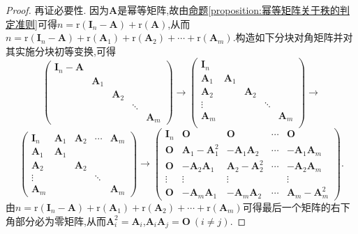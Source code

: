 \documentclass[../../main.tex]{subfiles}%
\begin{document}
\begin{proof}
再证必要性. 因为\(\boldsymbol{A}\)是幂等矩阵,故由\hyperref[proposition:幂等矩阵关于秩的判定准则]{命题\ref{proposition:幂等矩阵关于秩的判定准则}}可得\(n=\text{r}(\boldsymbol{I}_n - \boldsymbol{A})+\text{r}(\boldsymbol{A})\),从而\(n=\text{r}(\boldsymbol{I}_n - \boldsymbol{A})+\text{r}(\boldsymbol{A}_1)+\text{r}(\boldsymbol{A}_2)+\cdots+\text{r}(\boldsymbol{A}_m)\).构造如下分块对角矩阵并对其实施分块初等变换,可得
\[
\begin{pmatrix}
\boldsymbol{I}_n - \boldsymbol{A}&&&&\\
&\boldsymbol{A}_1&&&\\
&&\boldsymbol{A}_2&&\\
&&&\ddots&\\
&&&&\boldsymbol{A}_m
\end{pmatrix}\to
\left( \begin{matrix}
\boldsymbol{I}_n&		&		&		&		\\
\boldsymbol{A}_1&		\boldsymbol{A}_1&		&		&		\\
\boldsymbol{A}_2&		&		\boldsymbol{A}_2&		&		\\
\vdots&		&		&		\ddots&		\\
\boldsymbol{A}_m&		&		&		&		\boldsymbol{A}_m\\
\end{matrix} \right) \to
\]
\[
\begin{pmatrix}
\boldsymbol{I}_n&\boldsymbol{A}_1&\boldsymbol{A}_2&\cdots&\boldsymbol{A}_m\\
\boldsymbol{A}_1&\boldsymbol{A}_1&&&\\
\boldsymbol{A}_2&&\boldsymbol{A}_2&&\\
\vdots&&&\ddots&\\
\boldsymbol{A}_m&&&&\boldsymbol{A}_m
\end{pmatrix}\to
\begin{pmatrix}
\boldsymbol{I}_n&\boldsymbol{O}&\boldsymbol{O}&\cdots&\boldsymbol{O}\\
\boldsymbol{O}&\boldsymbol{A}_1 - \boldsymbol{A}_1^2&-\boldsymbol{A}_1\boldsymbol{A}_2&\cdots&-\boldsymbol{A}_1\boldsymbol{A}_m\\
\boldsymbol{O}&-\boldsymbol{A}_2\boldsymbol{A}_1&\boldsymbol{A}_2 - \boldsymbol{A}_2^2&\cdots&-\boldsymbol{A}_2\boldsymbol{A}_m\\
\vdots&\vdots&\vdots&&\vdots\\
\boldsymbol{O}&-\boldsymbol{A}_m\boldsymbol{A}_1&-\boldsymbol{A}_m\boldsymbol{A}_2&\cdots&\boldsymbol{A}_m - \boldsymbol{A}_m^2
\end{pmatrix}.
\]
由\(n=\text{r}(\boldsymbol{I}_n - \boldsymbol{A})+\text{r}(\boldsymbol{A}_1)+\text{r}(\boldsymbol{A}_2)+\cdots+\text{r}(\boldsymbol{A}_m)\)可得最后一个矩阵的右下角部分必为零矩阵,从而\(\boldsymbol{A}_i^2 = \boldsymbol{A}_i\),\(\boldsymbol{A}_i\boldsymbol{A}_j = \boldsymbol{O}\ (i\neq j)\).
\end{proof}
\end{document}
